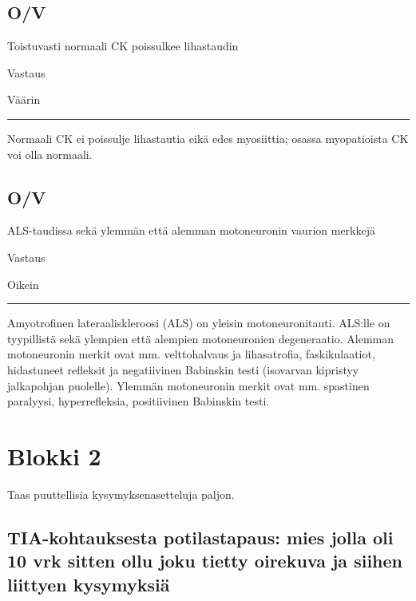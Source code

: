 \documentclass[
]{book}
\begin{document}
\subsection{O/V}\label{ov-38}

Toistuvasti normaali CK poissulkee lihastaudin

Vastaus

Väärin

\begin{center}\rule{0.5\linewidth}{0.5pt}\end{center}

Normaali CK ei poissulje lihastautia eikä edes myosiittia; osassa myopatioista CK voi olla normaali.\\

\subsection{O/V}\label{ov-39}

ALS-taudissa sekä ylemmän että alemman motoneuronin vaurion merkkejä

Vastaus

Oikein

\begin{center}\rule{0.5\linewidth}{0.5pt}\end{center}

Amyotrofinen lateraaliskleroosi (ALS) on yleisin motoneuronitauti. ALS:lle on tyypillistä sekä ylempien että alempien motoneuronien degeneraatio. Alemman motoneuronin merkit ovat mm. velttohalvaus ja lihasatrofia, faskikulaatiot, hidastuneet refleksit ja negatiivinen Babinskin testi (isovarvan kipristyy jalkapohjan puolelle). Ylemmän motoneuronin merkit ovat mm. spastinen paralyysi, hyperrefleksia, positiivinen Babinskin testi.

\section{Blokki 2}\label{blokki-2-2}

Taas puuttellisia kysymyksenasetteluja paljon.

\subsection{TIA-kohtauksesta potilastapaus: mies jolla oli 10 vrk sitten ollu joku tietty oirekuva ja siihen liittyen kysymyksiä}\label{tia-kohtauksesta-potilastapaus-mies-jolla-oli-10-vrk-sitten-ollu-joku-tietty-oirekuva-ja-siihen-liittyen-kysymyksiuxe4}
\end{document}
